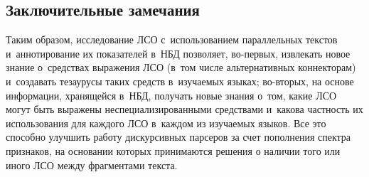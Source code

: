 \begin{multicols}{2}
\section{Заключительные замечания}

Таким образом, исследование ЛСО с~использованием параллельных текстов 
и~аннотирование их показателей в~НБД позволяет, во-пер\-вых, извлекать 
новое знание о~средствах выражения ЛСО (в~том числе альтернативных 
коннекторам) и~создавать тезаурусы таких средств в~изучаемых языках;  
во-вто\-рых, на основе информации, хранящейся в~НБД, получать новые 
знания о~том, какие ЛСО могут быть выражены неспециализированными 
средствами и~какова частность их использования для каждого ЛСО в~каждом 
из изучаемых языков. Все это способно улучшить работу дискурсивных 
парсеров за счет пополнения спектра признаков, на основании которых 
принимаются решения о наличии того или иного ЛСО между фрагментами 
текста.


\end{multicols}
